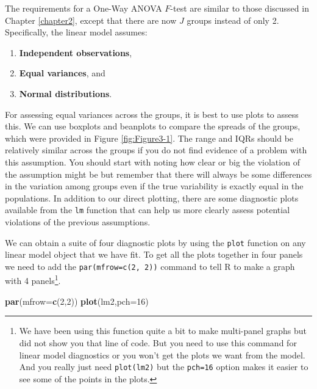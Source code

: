 \documentclass[]{book}
\newenvironment{Shaded}{\begin{snugshade}}{\end{snugshade}}
\newcommand{\KeywordTok}[1]{\textcolor[rgb]{0.13,0.29,0.53}{\textbf{#1}}}
\newcommand{\DataTypeTok}[1]{\textcolor[rgb]{0.13,0.29,0.53}{#1}}
\newcommand{\DecValTok}[1]{\textcolor[rgb]{0.00,0.00,0.81}{#1}}
\newcommand{\NormalTok}[1]{#1}
\let\rmarkdownfootnote\footnote%
\def\footnote{\protect\rmarkdownfootnote}
\theoremstyle{definition}
\theoremstyle{definition}
\theoremstyle{remark}
\begin{document}
The requirements for a One-Way ANOVA \(F\)-test are similar to those
discussed in Chapter \ref{chapter2}, except that there are now \(J\)
groups instead of only 2. Specifically, the linear model assumes:

\begin{enumerate}
\def\labelenumi{\arabic{enumi}.}
\item
  \textbf{Independent observations},
\item
  \textbf{Equal variances}, and
\item
  \textbf{Normal distributions}.
\end{enumerate}

For assessing equal variances across the groups, it is best to use plots
to assess this. We can use boxplots and beanplots to compare the spreads
of the groups, which were provided in Figure \ref{fig:Figure3-1}. The
range and IQRs should be relatively similar across the groups if you do
not find evidence of a problem with this assumption. You should start
with noting how clear or big the violation of the assumption might be
but remember that there will always be some differences in the variation
among groups even if the true variability is exactly equal in the
populations. In addition to our direct plotting, there are some
diagnostic plots available from the \texttt{lm} function that can help
us more clearly assess potential violations of the previous assumptions.

We can obtain a suite of four diagnostic plots by using the
\texttt{plot} function on any linear model object that we have fit. To
get all the plots together in four panels we need to add the
\texttt{par(mfrow=c(2,\ 2))} command to tell R to make a graph with 4
panels\footnote{We have been using this function quite a bit to make
  multi-panel graphs but did not show you that line of code. But you
  need to use this command for linear model diagnostics or you won't get
  the plots we want from the model. And you really just need
  \texttt{plot(lm2)} but the \texttt{pch=16} option makes it easier to
  see some of the points in the plots.}.

\begin{Shaded}
\begin{Highlighting}[]
\KeywordTok{par}\NormalTok{(}\DataTypeTok{mfrow=}\KeywordTok{c}\NormalTok{(}\DecValTok{2}\NormalTok{,}\DecValTok{2}\NormalTok{))}
\KeywordTok{plot}\NormalTok{(lm2,}\DataTypeTok{pch=}\DecValTok{16}\NormalTok{)}
\end{Highlighting}
\end{Shaded}
\end{document}
